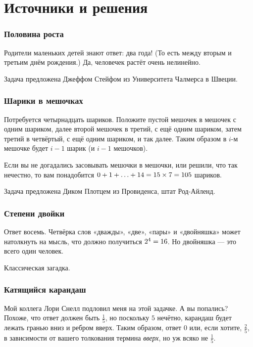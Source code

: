 \section*{Источники и решения}

\subsubsection*{Половина роста}

Родители маленьких детей знают ответ: два года!
(То есть между вторым и третьим днём рождения.)
Да, человечек растёт очень нелинейно.

Задача предложена Джеффом Стейфом из Университета Чалмерса в Швеции.

\subsubsection*{Шарики в мешочках}

Потребуется четырнадцать шариков.
Положите пустой мешочек в мешочек с одним шариком, 
далее второй мешочек в третий, с ещё одним шариком, затем третий в четвёртый, с ещё одним шариком, и так далее.
Таким образом в $i$-м мешочке будет $i-1$ шарик (и $i-1$ мешочков).

Если вы не догадались засовывать мешочки в мешочки, или решили, что так нечестно, то вам понадобится $0 + 1 \z+ \z\dots \z+ 14 \z= 15 \times 7 \z= 105$ шариков.

Задача предложена Диком Плотцем из Провиденса, штат Род-Айленд.

\subsubsection*{Степени двойки}

Ответ восемь.
Четвёрка слов «дважды», «две», «пары» и «двойняшка» может натолкнуть на мысль, что должно получиться $2^4 \z= 16$.
Но двойняшка — это всего один человек.

Классическая загадка.

\subsubsection*{Катящийся карандаш}

Мой коллега Лори Снелл подловил меня на этой задачке.
А вы попались?
Похоже, что ответ должен быть $\tfrac15$, но поскольку $5$ нечётно, карандаш будет лежать гранью вниз и ребром вверх.
Таким образом, ответ $0$ или, если хотите, $\tfrac25$, в зависимости от вашего толкования термина \emph{вверх}, но уж всяко не $\tfrac15$.

